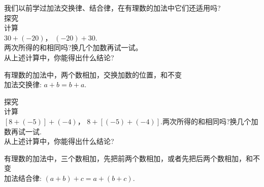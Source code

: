 \documentclass{article}
\begin{document}
    我们以前学过加法交换律、结合律，在有理数的加法中它们还适用吗?\\
    
    探究\\
    
    计算\\
    
    $30+(-20)$， $(-20)+30$.\\
    
    两次所得的和相同吗?换几个加数再试一试。\\
    
    
    从上述计算中，你能得出什么结论? \\
    
\begin{propertory}
    
有理数的加法中，两个数相加，交换加数的位置，和不变\\

加法交换律: $a+b=b+a$.\\

\end{propertory}
    
    探究\\
    
    计算\\

$[8+(-5)]+(-4)$， $8+[(-5)+(-4)]$.两次所得的和相同吗?换几个加数再试一试.\\

从上述计算中，你能得出什么结论? \\

\begin{propertory}
    
有理数的加法中，三个数相加，先把前两个数相加，或者先把后两个数相加，和不变\\
加法结合律: $(a+b)+c=a+(b+c)$.\\

\end{propertory}
\end{document}
